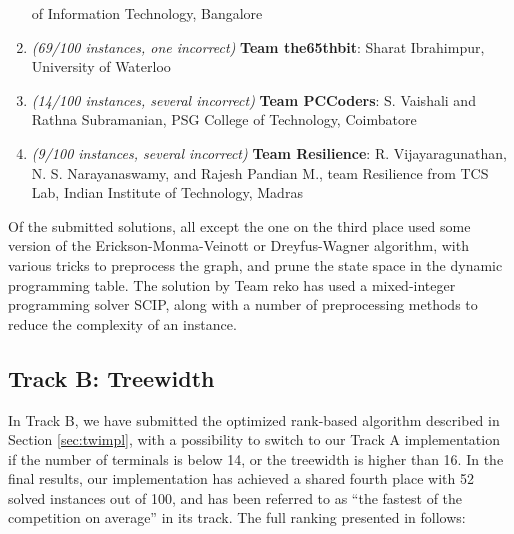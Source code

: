 \documentclass[thesis=M,english,hidelinks]{FITthesis}[2012/10/20]
\theoremstyle{definition}
\begin{document}
\begin{enumerate}
        of Information Technology, Bangalore
    \item
        \emph{(69/100 instances, one incorrect)} \textbf{Team the65thbit}: Sharat Ibrahimpur, University of Waterloo
    \item
        \emph{(14/100 instances, several incorrect)} \textbf{Team PCCoders}: S. Vaishali and Rathna Subramanian, PSG
        College of Technology, Coimbatore
    \item
        \emph{(9/100 instances, several incorrect)} \textbf{Team Resilience}: R. Vijayaragunathan, N. S. Narayanaswamy,
        and Rajesh Pandian M., team Resilience from TCS Lab, Indian Institute of Technology, Madras
\end{enumerate}

Of the submitted solutions, all except the one on the third place used some version of the Erickson-Monma-Veinott or
Dreyfus-Wagner algorithm, with various tricks to preprocess the graph, and prune the state space in the dynamic
programming table. The solution by Team reko has used a mixed-integer programming solver SCIP, along with a number
of preprocessing methods to reduce the complexity of an instance.

\subsection{Track B: Treewidth}

In Track B, we have submitted the optimized rank-based algorithm described in Section \ref{sec:twimpl}, with a
possibility to switch to our Track A implementation if the number of terminals is below 14, or the treewidth is higher
than 16. In the final results, our implementation has achieved a shared fourth place with 52 solved instances out of
100, and has been referred to as ``the fastest of the competition on average'' in its track. The full ranking presented
in \cite{PaceReport} follows:
\end{document}
